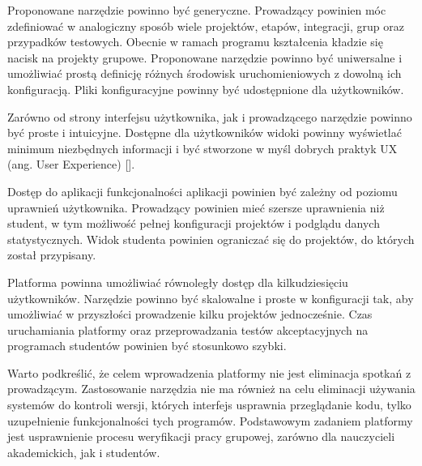 Proponowane narzędzie powinno być generyczne.
Prowadzący powinien móc zdefiniować w analogiczny sposób wiele projektów, etapów, integracji, grup oraz przypadków testowych.
Obecnie w ramach programu kształcenia kładzie się nacisk na projekty grupowe.
Proponowane narzędzie powinno być uniwersalne i umożliwiać prostą definicję różnych środowisk uruchomieniowych z dowolną ich konfiguracją.
Pliki konfiguracyjne powinny być udostępnione dla użytkowników.

Zarówno od strony interfejsu użytkownika, jak i prowadzącego narzędzie powinno być proste i intuicyjne.
Dostępne dla użytkowników widoki powinny wyświetlać minimum niezbędnych informacji i być stworzone w myśl dobrych praktyk UX (ang. User Experience) [].

Dostęp do aplikacji funkcjonalności aplikacji powinien być zależny od poziomu uprawnień użytkownika.
Prowadzący powinien mieć szersze uprawnienia niż student, w tym możliwość pełnej konfiguracji projektów i podglądu danych statystycznych.
Widok studenta powinien ograniczać się do projektów, do których został przypisany.

Platforma powinna umożliwiać równoległy dostęp dla kilkudziesięciu użytkowników.
Narzędzie powinno być skalowalne i proste w konfiguracji tak, aby umożliwiać w przyszłości prowadzenie kilku projektów jednocześnie.
Czas uruchamiania platformy oraz przeprowadzania testów akceptacyjnych na programach studentów powinien być stosunkowo szybki.
 
Warto podkreślić, że celem wprowadzenia platformy nie jest eliminacja spotkań z prowadzącym.
Zastosowanie narzędzia nie ma również na celu eliminacji używania systemów do kontroli wersji, których interfejs usprawnia przeglądanie kodu, tylko uzupełnienie funkcjonalności tych programów.
Podstawowym zadaniem platformy jest usprawnienie procesu weryfikacji pracy grupowej, zarówno dla nauczycieli akademickich, jak i studentów.	
	
